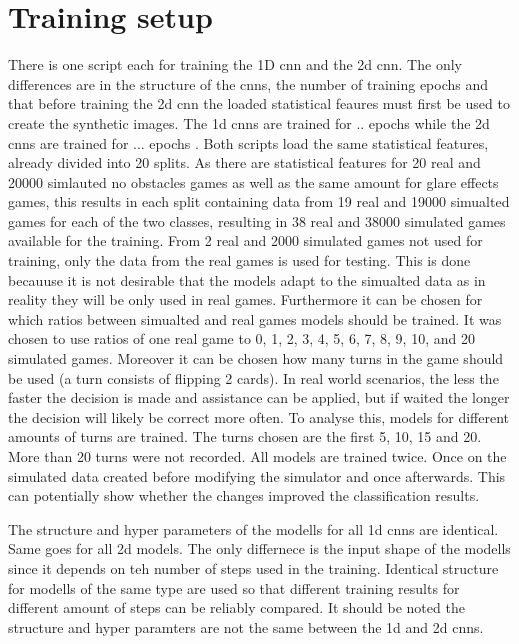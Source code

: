 \section{Training setup}
There is one script each for training the 1D cnn and the 2d cnn. The only differences are in the structure of the cnns, the number of training epochs and that before training the 2d cnn the loaded statistical feaures must first be used to create the synthetic images. The 1d cnns are trained for .. epochs while the 2d cnns are trained for ... epochs . Both scripts load the same statistical features, already divided into 20 splits. As there are statistical features for 20 real and 20000 simlauted no obstacles games as well as the same amount for glare effects games, this results in each split containing data from 19 real and 19000 simualted games for each of the two classes, resulting in 38 real and 38000 simulated games available for the training. From 2 real and 2000 simulated games not used for training, only the data from the real games is used for testing. This is done becauuse it is not desirable that the models adapt to the simualted data as in reality they will be only used in real games. Furthermore it can be chosen for which ratios between simualted and real games models should be trained. It was chosen to use ratios of one real game to 0, 1, 2, 3, 4, 5, 6, 7, 8, 9, 10, and 20 simulated games. Moreover it can be chosen how many turns in the game should be used (a turn consists of flipping 2 cards). In real world scenarios, the less the faster the decision is made and assistance can be applied, but if waited the longer the decision will likely be correct more often. To analyse this, models for different amounts of turns are trained. The turns chosen are the first 5, 10, 15 and 20. More than 20 turns were not recorded.  All models are trained twice. Once on the simulated data created before modifying the simulator and once afterwards. This can potentially show whether the changes improved the classification results. 

The structure and hyper parameters of the modells for all 1d cnns are identical. Same goes for all 2d models. The only differnece is the input shape of the modells since it depends on teh number of steps used in the training. Identical structure for modells of the same type are used so that different training results for different amount of steps can be reliably compared. It should be noted the structure and hyper paramters are not the same between the 1d and 2d cnns. 

